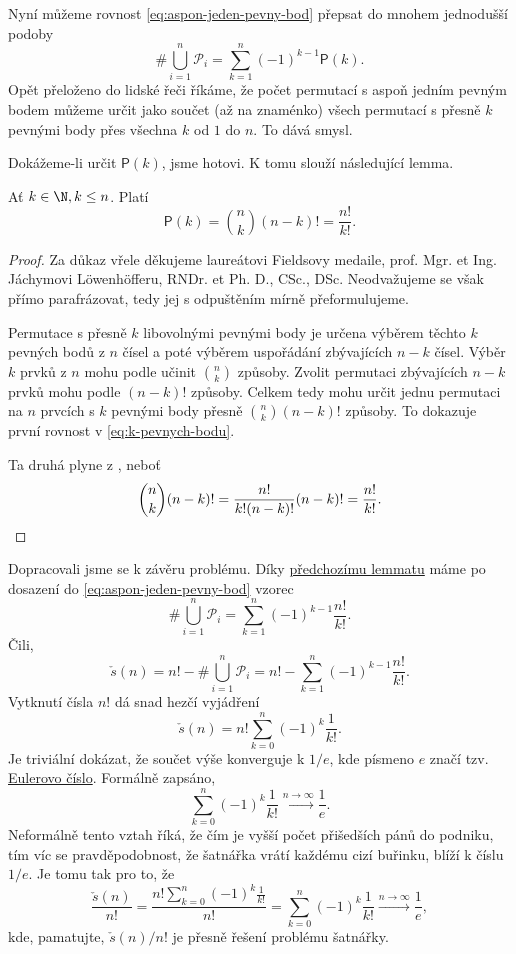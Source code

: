 Nyní můžeme rovnost \eqref{eq:aspon-jeden-pevny-bod} přepsat do mnohem
jednodušší podoby
\[
 \# \bigcup_{i=1}^{n} \mathcal{P}_i = \sum_{k=1}^{n} (-1)^{k-1} \mathsf{P}(k).
\]
Opět přeloženo do lidské řeči říkáme, že počet permutací s aspoň jedním pevným
bodem můžeme určit jako součet (až na znaménko) všech permutací s přesně $k$
pevnými body přes všechna $k$ od $1$ do $n$. To dává smysl.

Dokážeme-li určit $\mathsf{P}(k)$, jsme hotovi. K tomu slouží následující lemma.

\begin{lemma}
 \label{lemma:permutace-s-k-pevnymi-body}
 Ať $k \in\N, k \leq n$. Platí
 \begin{equation*}
  \label{eq:k-pevnych-bodu}
  \tag{$\bullet$}
  \mathsf{P}(k) = \binom{n}{k}(n-k)! = \frac{n!}{k!}.
 \end{equation*}
\end{lemma}
\begin{proof}
 Za důkaz vřele děkujeme laureátovi Fieldsovy medaile, prof. Mgr. et Ing.
 Jáchymovi Löwenhöfferu, RNDr. et Ph. D., CSc., DSc. Neodvažujeme se však přímo
 parafrázovat, tedy jej s odpuštěním mírně přeformulujeme.

 Permutace s přesně $k$ libovolnými pevnými body je určena výběrem těchto $k$ 
 pevných bodů z $n$ čísel a poté výběrem uspořádání zbývajících $n-k$ čísel.
 Výběr $k$ prvků z $n$ mohu podle
  učinit $\binom{n}{k}$
 způsoby. Zvolit permutaci zbývajících $n-k$ prvků mohu podle
  $(n-k)!$ způsoby. Celkem tedy
 mohu určit jednu permutaci na $n$ prvcích s $k$ pevnými body přesně
 $\binom{n}{k}(n-k)!$ způsoby. To dokazuje první rovnost v
 \eqref{eq:k-pevnych-bodu}.

 Ta druhá plyne z , neboť
 \[
  \binom{n}{k}(n-k)! = \frac{n!}{k!(n-k)!}(n-k)! = \frac{n!}{k!}.\qedhere
 \]
\end{proof}

Dopracovali jsme se k závěru problému. Díky
\hyperref[lemma:permutace-s-k-pevnymi-body]{předchozímu lemmatu} máme po
dosazení do \eqref{eq:aspon-jeden-pevny-bod} vzorec
\[
 \# \bigcup_{i=1}^{n} \mathcal{P}_i = \sum_{k=1}^{n} (-1)^{k-1} \frac{n!}{k!}.
\]
Čili,
\[
 \check{s}(n) = n! - \# \bigcup_{i=1}^{n} \mathcal{P}_i = n! - \sum_{k=1}^{n}
 (-1)^{k-1} \frac{n!}{k!}.
\]
Vytknutí čísla $n!$ dá snad hezčí vyjádření
\[
 \check{s}(n) = n! \sum_{k=0}^{n} (-1)^{k} \frac{1}{k!}.
\]
Je triviální dokázat, že součet výše konverguje k $1 / e$, kde písmeno $e$ značí
tzv. \href{https://cs.wikipedia.org/wiki/Eulerovo_%C4%8D%C3%ADslo}{Eulerovo
číslo}. Formálně zapsáno,
\[
 \sum_{k=0}^{n} (-1)^{k} \frac{1}{k!} \xrightarrow{n \to \infty}
 \frac{1}{e}.
\]
Neformálně tento vztah říká, že čím je vyšší počet přišedších pánů do podniku,
tím víc se pravděpodobnost, že šatnářka vrátí každému cizí buřinku, blíží k
číslu $1 / e$. Je tomu tak pro to, že
\[
 \frac{\check{s}(n)}{n!} = \frac{n!\sum_{k=0}^{n} (-1)^{k} \frac{1}{k!}}{n!} =
 \sum_{k=0}^{n} (-1)^{k} \frac{1}{k!} \xrightarrow{n \to \infty} \frac{1}{e},
\]
kde, pamatujte, $\check{s}(n) / n!$ je přesně řešení problému šatnářky.
